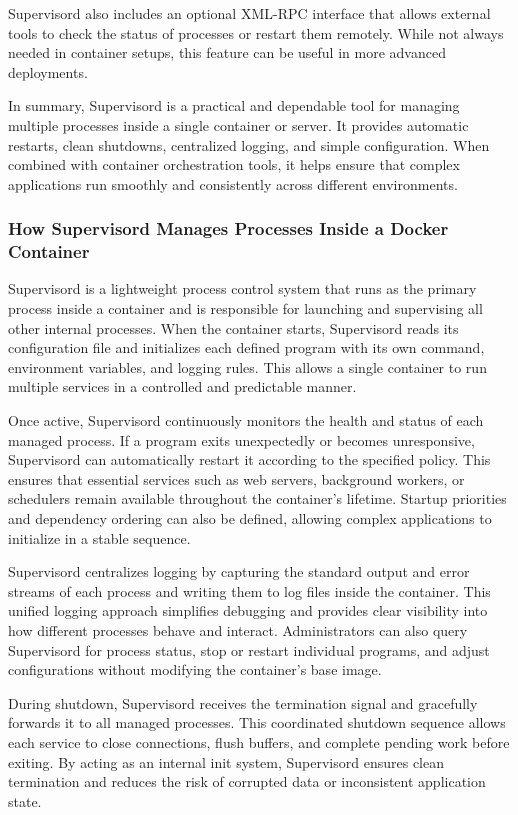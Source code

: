\documentclass[12pt,titlepage]{article}
\begin{document}
Supervisord also includes an optional XML-RPC interface that allows external tools to check the status of processes or restart them remotely. While not always needed in container setups, this feature can be useful in more advanced deployments.

In summary, Supervisord is a practical and dependable tool for managing multiple processes inside a single container or server. It provides automatic restarts, clean shutdowns, centralized logging, and simple configuration. When combined with container orchestration tools, it helps ensure that complex applications run smoothly and consistently across different environments.

\subsubsection{How Supervisord Manages Processes Inside a Docker Container}

Supervisord is a lightweight process control system that runs as the primary process inside a container and is responsible for launching and supervising all other internal processes. When the container starts, Supervisord reads its configuration file and initializes each defined program with its own command, environment variables, and logging rules. This allows a single container to run multiple services in a controlled and predictable manner.

Once active, Supervisord continuously monitors the health and status of each managed process. If a program exits unexpectedly or becomes unresponsive, Supervisord can automatically restart it according to the specified policy. This ensures that essential services such as web servers, background workers, or schedulers remain available throughout the container's lifetime. Startup priorities and dependency ordering can also be defined, allowing complex applications to initialize in a stable sequence.

Supervisord centralizes logging by capturing the standard output and error streams of each process and writing them to log files inside the container. This unified logging approach simplifies debugging and provides clear visibility into how different processes behave and interact. Administrators can also query Supervisord for process status, stop or restart individual programs, and adjust configurations without modifying the container's base image.

During shutdown, Supervisord receives the termination signal and gracefully forwards it to all managed processes. This coordinated shutdown sequence allows each service to close connections, flush buffers, and complete pending work before exiting. By acting as an internal init system, Supervisord ensures clean termination and reduces the risk of corrupted data or inconsistent application state.
\end{document}
